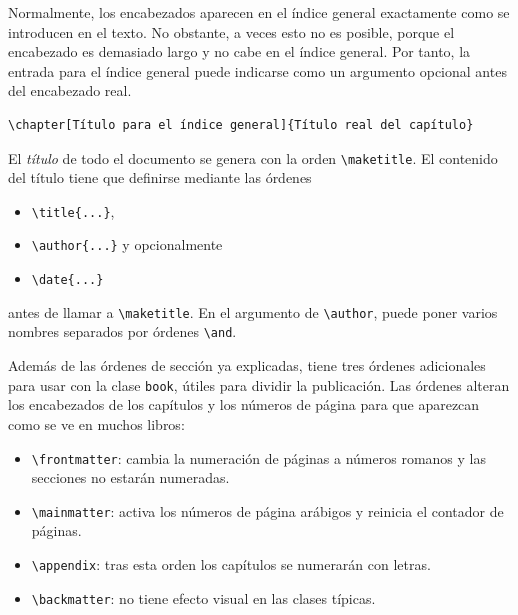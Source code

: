 \documentclass[a4,10pt]{aleph-notas}
\begin{document}
Normalmente, los encabezados aparecen en el índice general exactamente como se introducen en el texto.  No obstante, a veces esto no es posible, porque el encabezado es demasiado largo y no cabe en el índice general.  Por tanto, la entrada para el índice general puede indicarse como un argumento opcional antes del encabezado real.

\begin{lstlisting}[frame=single]
\chapter[Título para el índice general]{Título real del capítulo}
\end{lstlisting}

El \emph{título} de todo el documento se genera con la orden \verb"\maketitle". El contenido del título tiene que definirse mediante las órdenes
 \begin{itemize}
  \item \verb|\title{...}|,
  \item \verb|\author{...}| y opcionalmente
  \item \verb|\date{...}|
 \end{itemize}
antes de llamar a \verb|\maketitle|.  En el argumento de \verb"\author", puede poner varios nombres separados por órdenes \verb"\and".

Además de las órdenes de sección ya explicadas, \LaTeXe{} tiene tres órdenes adicionales para usar con la clase \verb|book|, útiles
para dividir la publicación.  Las órdenes alteran los encabezados de los capítulos y los números de página para que aparezcan como se ve en
muchos libros:
 \begin{itemize}
  \item \verb|\frontmatter|: cambia la numeración de páginas a números romanos y las secciones no estarán numeradas.
  \item \verb|\mainmatter|: activa los números de página arábigos y reinicia el contador de páginas.
  \item \verb|\appendix|: tras esta orden los capítulos se numerarán con letras.
  \item \verb|\backmatter|: no tiene efecto visual en las clases típicas.
 \end{itemize}
\end{document}
